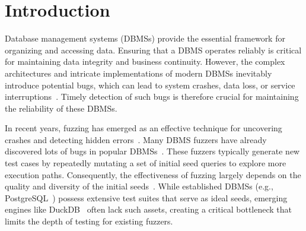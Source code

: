\documentclass[conference]{IEEEtran}
\newcommand{\pg}{PostgreSQL\xspace}
\newcommand{\duckdb}{DuckDB\xspace}
\begin{document}
\section{Introduction}

%
Database management systems (DBMSs) provide the essential framework for organizing and accessing data.
Ensuring that a DBMS operates reliably is critical for maintaining data integrity and business continuity.
However, the complex architectures and intricate implementations of modern DBMSs inevitably introduce potential bugs, which can lead to system crashes, data loss, or service interruptions~\cite{pgbugs, mysqlbugs}.
Timely detection of such bugs is therefore crucial for maintaining the reliability of these DBMSs.

In recent years, fuzzing has emerged as an effective technique for uncovering crashes and detecting hidden errors~\cite{afl, libfuzzer, aflpp, pafl}. 
Many DBMS fuzzers have already discovered lots of bugs in popular DBMSs~\cite{sqlsmithbug, DBbugs, sqlsmith}. 
These fuzzers typically generate new test cases by repeatedly mutating a set of initial seed queries to explore more execution paths. Consequently, the effectiveness of fuzzing largely depends on the quality and diversity of the initial seeds~\cite{fu2022griffin, liang2023sequence, zhong2020squirrel}.
While established DBMSs (e.g., \pg{}~\cite{pg_git}) possess extensive test suites that serve as ideal seeds, emerging engines like \duckdb{}~\cite{duckdb_git} often lack such assets, creating a critical bottleneck that limits the depth of testing for existing fuzzers.
\end{document}
